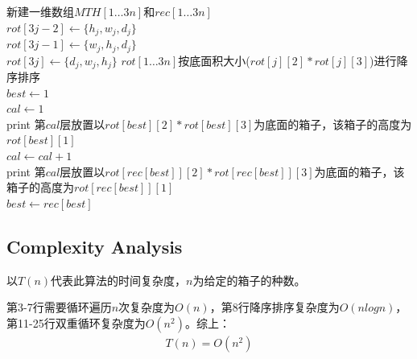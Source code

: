 \documentclass{ctexart}
\begin{document}
\begin{algorithm}[H]
    \SetAlgoLined %
	\caption{$Maximum-Tower-Height(a,n)$}%
	\BlankLine
	\BlankLine
	新建一维数组$MTH[1 \ldots 3n]$和$rec[1 \ldots 3n]$ \\
	{$rot[3j-2] \leftarrow \{h_j,w_j,d_j\}$ \\
	 $rot[3j-1] \leftarrow \{w_j,h_j,d_j\}$ \\
	 $rot[3j] \leftarrow \{d_j,w_j,h_j\}$ } 
	$rot[1 \ldots 3n]$按底面积大小($rot[j][2]*rot[j][3]$)进行降序排序\\
	$best \leftarrow 1$ \\
	$cal \leftarrow 1 $ \\
	print 第$cal$层放置以$rot[best][2]*rot[best][3]$为底面的箱子，该箱子的高度为$rot[best][1]$ \\
	{
	$cal \leftarrow cal+1$ \\
	print 第$cal$层放置以$rot[rec[best]][2]*rot[rec[best]][3]$为底面的箱子，该箱子的高度为$rot[rec[best]][1]$ \\
    $best \leftarrow rec[best]$
	}

\end{algorithm}

\subsection{Complexity Analysis}
以$T(n)$代表此算法的时间复杂度，$n$为给定的箱子的种数。

第3-7行需要循环遍历$n$次复杂度为$O(n)$，第8行降序排序复杂度为$O(nlogn)$，第11-25行双重循环复杂度为$O(n^2)$。综上：
\begin{align*}
    T(n)=O(n^2)
\end{align*}
\end{document}

